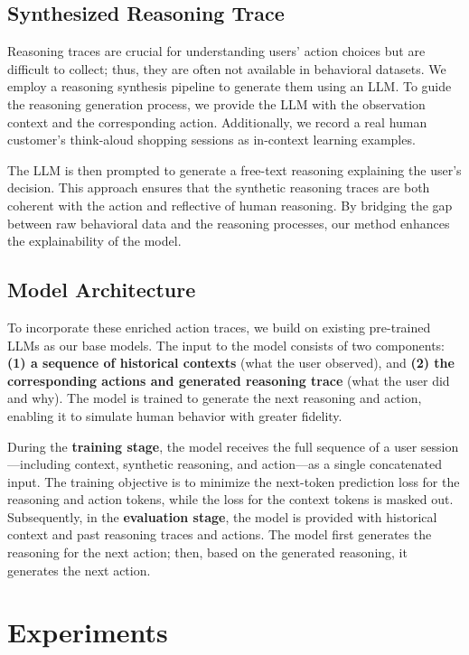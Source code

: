 \documentclass[11pt]{article}
\begin{document}
\subsection{Synthesized Reasoning Trace}
\label{sec:data-synthesize}
Reasoning traces are crucial for understanding users' action choices but are difficult to collect; thus, they are often not available in behavioral datasets.
We employ a reasoning synthesis pipeline to generate them using an LLM.
To guide the reasoning generation process, we provide the LLM with the observation context and the corresponding action.
Additionally, we record a real human customer's think-aloud shopping sessions as in-context learning examples.

The LLM is then prompted to generate a free-text reasoning explaining the user's decision.
This approach ensures that the synthetic reasoning traces are both coherent with the action and reflective of human reasoning.
By bridging the gap between raw behavioral data and the reasoning processes, our method enhances the explainability of the model.

\subsection{Model Architecture}

To incorporate these enriched action traces, we build on existing pre-trained LLMs as our base models.
The input to the model consists of two components: \textbf{(1) a sequence of historical contexts} (what the user observed), and \textbf{(2) the corresponding actions and generated reasoning trace} (what the user did and why). The model is trained to generate the next reasoning and action, enabling it to simulate human behavior with greater fidelity.

During the \textbf{training stage}, the model receives the full sequence of a user session—including context, synthetic reasoning, and action—as a single concatenated input. 
The training objective is to minimize the next-token prediction loss for the reasoning and action tokens, while the loss for the context tokens is masked out. 
Subsequently, in the \textbf{evaluation stage}, the model is provided with historical context and past reasoning traces and actions. The model first generates the reasoning for the next action; then, based on the generated reasoning, it generates the next action.

\section{Experiments}
\end{document}
